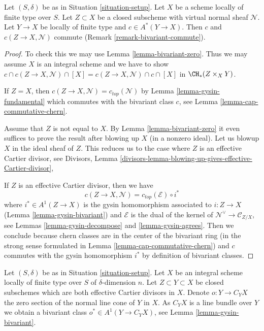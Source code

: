 \begin{lemma}
\label{lemma-gysin-commutes}
Let $(S, \delta)$ be as in Situation \ref{situation-setup}. Let $X$ be a scheme
locally of finite type over $S$. Let $Z \subset X$ be a closed subscheme
with virtual normal sheaf $\mathcal{N}$. Let $Y \to X$ be locally of
finite type and $c \in A^*(Y \to X)$. Then $c$ and $c(Z \to X, \mathcal{N})$
commute (Remark \ref{remark-bivariant-commute}).
\end{lemma}

\begin{proof}
To check this we may use Lemma \ref{lemma-bivariant-zero}.
Thus we may assume $X$ is an integral scheme and we have to show
$c \cap c(Z \to X, \mathcal{N}) \cap [X] =
c(Z \to X, \mathcal{N}) \cap c \cap [X]$ in $\CH_*(Z \times_X Y)$.

\medskip\noindent
If $Z = X$, then $c(Z \to X, \mathcal{N}) = c_{top}(\mathcal{N})$ by
Lemma \ref{lemma-gysin-fundamental} which commutes
with the bivariant class $c$, see Lemma \ref{lemma-cap-commutative-chern}.

\medskip\noindent
Assume that $Z$ is not equal to $X$. By Lemma \ref{lemma-bivariant-zero}
it even suffices to prove the result after blowing up $X$ (in a nonzero ideal).
Let us blowup $X$ in the ideal sheaf of $Z$. This reduces us to the case
where $Z$ is an effective Cartier divisor, see
Divisors, Lemma
\ref{divisors-lemma-blowing-up-gives-effective-Cartier-divisor},

\medskip\noindent
If $Z$ is an effective Cartier divisor, then we have
$$
c(Z \to X, \mathcal{N}) =
c_{top}(\mathcal{E}) \circ i^*
$$
where $i^* \in A^1(Z \to X)$ is the gysin homomorphism
associated to $i : Z \to X$ (Lemma \ref{lemma-gysin-bivariant})
and $\mathcal{E}$ is the dual of the kernel of
$\mathcal{N}^\vee \to \mathcal{C}_{Z/X}$, see
Lemmas \ref{lemma-gysin-decompose} and \ref{lemma-gysin-agrees}.
Then we conclude because chern classes are in the center of the
bivariant ring (in the strong sense formulated in
Lemma \ref{lemma-cap-commutative-chern}) and $c$ commutes
with the gysin homomorphism $i^*$ by definition of bivariant classes.
\end{proof}

\noindent
Let $(S, \delta)$ be as in Situation \ref{situation-setup}. Let $X$ be an
integral scheme locally of finite type over $S$ of $\delta$-dimension $n$.
Let $Z \subset Y \subset X$ be closed subschemes which are both effective
Cartier divisors in $X$. Denote $o : Y \to C_Y X$ the zero section of the
normal line cone of $Y$ in $X$. As $C_YX$ is a line bundle over $Y$
we obtain a bivariant class $o^* \in A^1(Y \to C_YX)$, see
Lemma \ref{lemma-gysin-bivariant}.

